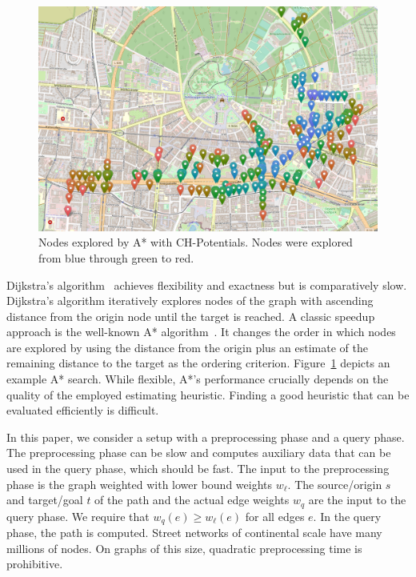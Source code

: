 \documentclass[letterpaper]{article} %
\begin{document}
\begin{figure}

\centering
\includegraphics[width=\columnwidth]{fig/searchspace.png}


\caption{Nodes explored by A* with CH-Potentials. Nodes were explored from blue through green to red.}
\label{img:search-space}
\end{figure}


Dijkstra's algorithm~\cite{d-ntpcg-59} achieves flexibility and exactness but is comparatively slow.
Dijkstra's algorithm iteratively explores nodes of the graph with ascending distance from the origin node until the target is reached.
A classic speedup approach is the well-known A* algorithm~\cite{hnr-afbhd-68}.
It changes the order in which nodes are explored by using the distance from the origin plus an estimate of the remaining distance to the target as the ordering criterion.
Figure~\ref{img:search-space} depicts an example A* search.
While flexible, A*'s performance crucially depends on the quality of the employed estimating heuristic.
Finding a good heuristic that can be evaluated efficiently is difficult.

In this paper, we consider a setup with a preprocessing phase and a query phase.
The preprocessing phase can be slow and computes auxiliary data that can be used in the query phase, which should be fast.
The input to the preprocessing phase is the graph weighted with lower bound weights $w_\ell$.
The source/origin $s$ and target/goal $t$ of the path and the actual edge weights $w_q$ are the input to the query phase.
We require that $w_q(e)\ge w_\ell(e)$ for all edges $e$.
In the query phase, the path is computed.
%
Street networks of continental scale have many millions of nodes.
On graphs of this size, quadratic preprocessing time is prohibitive.
\end{document}
